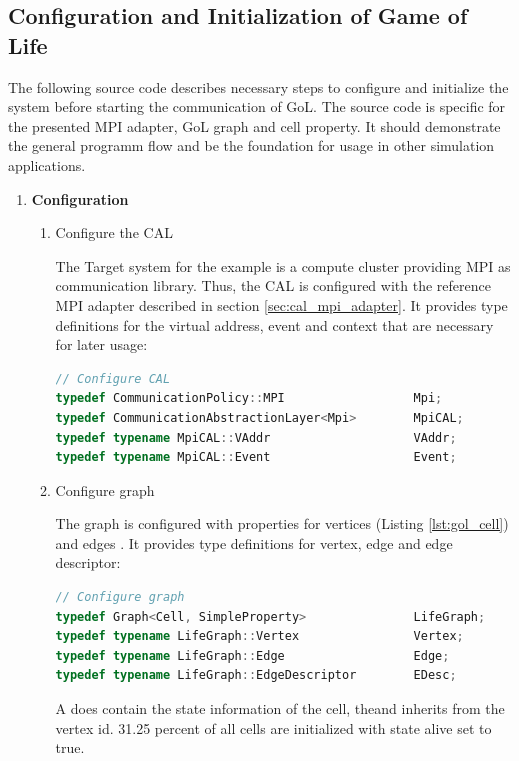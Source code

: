 \subsection{Configuration and Initialization of Game of Life}
The following source code describes necessary steps to configure and
initialize the system before starting the communication of GoL. The
source code is specific for the presented MPI adapter, GoL graph and
cell property. It should demonstrate the general programm flow and be
the foundation for usage in other simulation applications.

\begin{enumerate}

\item \textbf{Configuration}
\begin{enumerate}

\item Configure the CAL
  
  The Target system for the example is a compute cluster providing MPI
  as communication library. Thus, the CAL is configured with the
  reference MPI adapter described in section
  \ref{sec:cal_mpi_adapter}. It provides type definitions for the
  virtual address, event and context that are necessary for
  later usage:

  \begin{lstlisting}[language=C++, label=lst:conf_cal, caption={\ }]
// Configure CAL
typedef CommunicationPolicy::MPI                  Mpi;
typedef CommunicationAbstractionLayer<Mpi>        MpiCAL;
typedef typename MpiCAL::VAddr                    VAddr;
typedef typename MpiCAL::Event                    Event;
  \end{lstlisting}

\item Configure graph

  The graph is configured with properties for vertices 
  (Listing \ref{lst:gol_cell}) and edges . It
  provides type definitions for vertex, edge and edge descriptor:

  \begin{lstlisting}[language=C++, label=lst:conf_graph, caption={\ }]
// Configure graph
typedef Graph<Cell, SimpleProperty>               LifeGraph;
typedef typename LifeGraph::Vertex                Vertex;
typedef typename LifeGraph::Edge                  Edge;
typedef typename LifeGraph::EdgeDescriptor        EDesc;
  \end{lstlisting}

  A  does contain the state information of the cell, theand
  inherits from  the vertex id. 31.25
  percent of all cells are initialized with state alive set to true.


\end{enumerate}
\end{enumerate}
